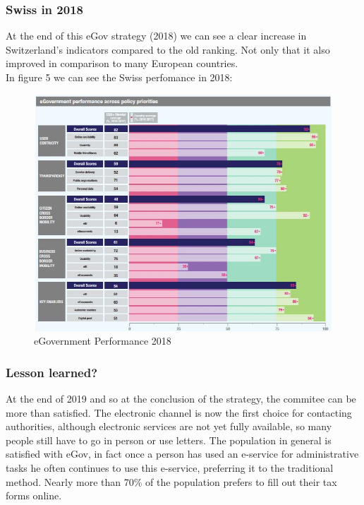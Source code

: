 \subsubsection*{Swiss in 2018}
At the end of this eGov strategy (2018) we can see a clear increase in Switzerland's indicators compared to the old ranking.
Not only that it also improved in comparison to many European countries.\\
In figure 5 we can see the Swiss perfomance in 2018:
\begin{figure}[!htb]
\centering
\includegraphics[width=1\textwidth]{images/key2018.jpg}
\caption{eGovernment Performance 2018 \cite{eGov2018bench}}
\label{bench2018}
\end{figure}
\FloatBarrier

\subsubsection*{Lesson learned?} 
At the end of 2019 and so at the conclusion of the strategy, the commitee can be more than satisfied.
The electronic channel is now the first choice for contacting authorities, although electronic services are not yet fully available, so many people still have to go in person or use letters.
The population in general is satisfied with eGov, in fact once a person has used an e-service for administrative tasks he often continues to use this e-service, preferring it to the traditional method. Nearly more than 70\% of the population prefers to fill out their tax forms online.


